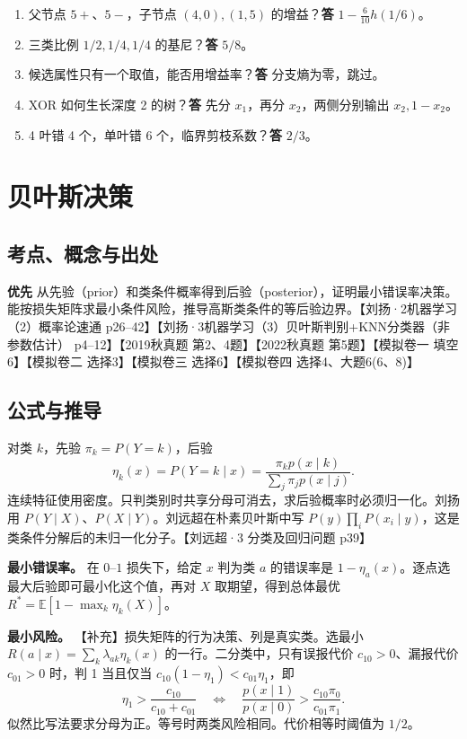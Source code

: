 \documentclass[UTF8,a4paper,zihao=-4,fontset=fandol]{ctexart}
\begin{document}
\begin{enumerate}[nosep]
\item 父节点 \(5+\)、\(5-\)，子节点 \((4,0),(1,5)\) 的增益？\textbf{答} \(1-\frac6{10}h(1/6)\)。
\item 三类比例 \(1/2,1/4,1/4\) 的基尼？\textbf{答} \(5/8\)。
\item 候选属性只有一个取值，能否用增益率？\textbf{答} 分支熵为零，跳过。
\item XOR 如何生长深度 2 的树？\textbf{答} 先分 \(x_1\)，再分 \(x_2\)，两侧分别输出 \(x_2,1-x_2\)。
\item 4 叶错 4 个，单叶错 6 个，临界剪枝系数？\textbf{答} \(2/3\)。
\end{enumerate}

\section{贝叶斯决策}
\label{ch:prml-bayes}

\subsection{考点、概念与出处}
\textbf{优先} 从先验（prior）和类条件概率得到后验（posterior），证明最小错误率决策。能按损失矩阵求最小条件风险，推导高斯类条件的等后验边界。【刘扬·2机器学习（2）概率论速通 p26–42】【刘扬·3机器学习（3）贝叶斯判别+KNN分类器（非参数估计） p4–12】【2019秋真题 第2、4题】【2022秋真题 第5题】【模拟卷一 填空6】【模拟卷二 选择3】【模拟卷三 选择6】【模拟卷四 选择4、大题6(6、8)】

\subsection{公式与推导}
对类 \(k\)，先验 \(\pi_k=P(Y=k)\)，后验
\[
 \eta_k(x)=P(Y=k\mid x)=
 \frac{\pi_kp(x\mid k)}{\sum_j\pi_jp(x\mid j)}.
\]
连续特征使用密度。只判类别时共享分母可消去，求后验概率时必须归一化。刘扬用 \(P(Y\mid X)\)、\(P(X\mid Y)\)。刘远超在朴素贝叶斯中写 \(P(y)\prod_iP(x_i\mid y)\)，这是类条件分解后的未归一化分子。【刘远超·3 分类及回归问题 p39】

\textbf{最小错误率。} 在 \(0\)--\(1\) 损失下，给定 \(x\) 判为类 \(a\) 的错误率是 \(1-\eta_a(x)\)。逐点选最大后验即可最小化这个值，再对 \(X\) 取期望，得到总体最优 \(R^*=\mathbb E[1-\max_k\eta_k(X)]\)。

\textbf{最小风险。} 【补充】损失矩阵的行为决策、列是真实类。选最小 \(R(a\mid x)=\sum_k\lambda_{ak}\eta_k(x)\) 的一行。二分类中，只有误报代价 \(c_{10}>0\)、漏报代价 \(c_{01}>0\) 时，判 1 当且仅当 \(c_{10}(1-\eta_1)<c_{01}\eta_1\)，即
\[
 \eta_1>\frac{c_{10}}{c_{10}+c_{01}}
 \quad\Longleftrightarrow\quad
 \frac{p(x\mid1)}{p(x\mid0)}>\frac{c_{10}\pi_0}{c_{01}\pi_1}.
\]
似然比写法要求分母为正。等号时两类风险相同。代价相等时阈值为 \(1/2\)。
\end{document}
